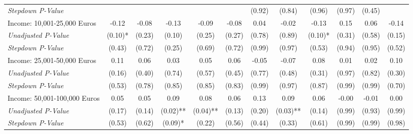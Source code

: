 \begin{tabular}{l c c c c c c c c c c c}
\quad \textit{Stepdown P-Value} &  &  &  &  &  & (0.92) & (0.84) & (0.96) & (0.97) & (0.45) &  \\
Income: 10,001-25,000 Euros & -0.12 & -0.08 & -0.13 & -0.09 & -0.08 & 0.04 & -0.02 & -0.13 & 0.15 & 0.06 & -0.14 \\
\quad \textit{Unadjusted P-Value} & (0.10)* & (0.23) & (0.10) & (0.25) & (0.27) & (0.78) & (0.89) & (0.10)* & (0.31) & (0.58) & (0.15) \\
\quad \textit{Stepdown P-Value} & (0.43) & (0.72) & (0.25) & (0.69) & (0.72) & (0.99) & (0.97) & (0.53) & (0.94) & (0.95) & (0.52) \\
Income: 25,001-50,000 Euros & 0.11 & 0.06 & 0.03 & 0.05 & 0.06 & -0.05 & -0.07 & 0.08 & 0.01 & 0.02 & 0.10 \\
\quad \textit{Unadjusted P-Value} & (0.16) & (0.40) & (0.74) & (0.57) & (0.45) & (0.77) & (0.48) & (0.31) & (0.97) & (0.82) & (0.30) \\
\quad \textit{Stepdown P-Value} & (0.53) & (0.78) & (0.85) & (0.85) & (0.83) & (0.99) & (0.97) & (0.87) & (0.99) & (0.99) & (0.70) \\
Income: 50,001-100,000 Euros & 0.05 & 0.05 & 0.09 & 0.08 & 0.06 & 0.13 & 0.09 & 0.06 & -0.00 & -0.01 & 0.00 \\
\quad \textit{Unadjusted P-Value} & (0.17) & (0.14) & (0.02)** & (0.04)** & (0.13) & (0.20) & (0.03)** & (0.14) & (0.99) & (0.93) & (0.99) \\
\quad \textit{Stepdown P-Value} & (0.53) & (0.62) & (0.09)* & (0.22) & (0.56) & (0.44) & (0.33) & (0.61) & (0.99) & (0.99) & (0.98) \\
\bottomrule
\end{tabular}
